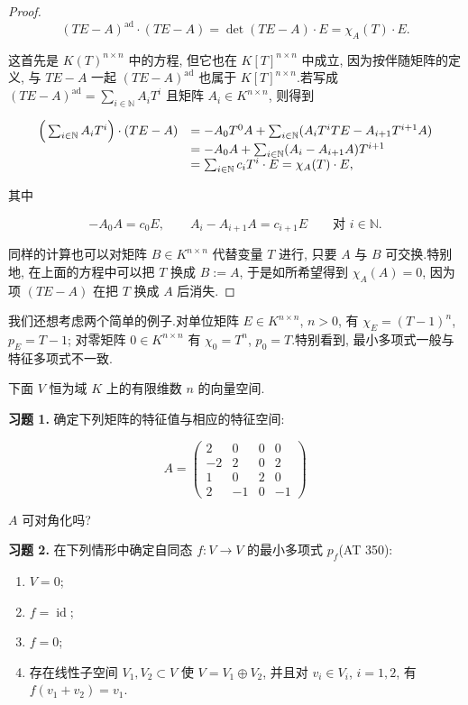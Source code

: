 \begin{proof}
\[
(TE - A)^{\mathrm{ad}} \cdot (TE - A) = \det(TE - A) \cdot E = \chi_A(T) \cdot E\text{.}\]

这首先是 $K(T)^{n \times n}$ 中的方程, 但它也在 $K[T]^{n \times n}$ 中成立, 因为按伴随矩阵的定义, 与 $TE - A$ 一起 $(TE - A)^{\mathrm{ad}}$ 也属于 $K[T]^{n \times n}$.若写成 $(TE - A)^{\mathrm{ad}} = \sum_{i \in \mathbb{N}} A_i T^i$ 且矩阵 $A_i \in K^{n \times n}$, 则得到

\[
\begin{array}{r l}
\Big(\sum_{i \in \mathbb{N}} A_i T^i\Big) \cdot (TE - A) & = -A_0 T^0 A + \sum_{i \in \mathbb{N}} (A_i T^i T E - A_{i + 1} T^{i + 1} A) \\
& = -A_0 A + \sum_{i \in \mathbb{N}} (A_i - A_{i + 1} A) T^{i + 1} \\
& = \sum_{i \in \mathbb{N}} c_i T^i \cdot E = \chi_A(T) \cdot E,
\end{array}\]

其中

\[
-A_0 A = c_0 E, \qquad A_i - A_{i + 1} A = c_{i + 1} E \qquad \text{对 } i \in \mathbb{N}\text{.}\]

同样的计算也可以对矩阵 $B \in K^{n \times n}$ 代替变量 $T$ 进行, 只要 $A$ 与 $B$ 可交换.特别地, 在上面的方程中可以把 $T$ 换成 $B := A$, 于是如所希望得到 $\chi_A(A) = 0$, 因为项 $(TE - A)$ 在把 $T$ 换成 $A$ 后消失.
\end{proof}

我们还想考虑两个简单的例子.对单位矩阵 $E \in K^{n \times n}$, $n > 0$, 有 $\chi_E = (T - 1)^n$, $p_E = T - 1$; 对零矩阵 $0 \in K^{n \times n}$ 有 $\chi_0 = T^n$, $p_0 = T$.特别看到, 最小多项式一般与特征多项式不一致.

\aufgaben

下面 $V$ 恒为域 $K$ 上的有限维数 $n$ 的向量空间.

\noindent\textbf{习题 1.} 确定下列矩阵的特征值与相应的特征空间:

\[
A = \left(\begin{array}{cccc} 2 & 0 & 0 & 0 \\ -2 & 2 & 0 & 2 \\ 1 & 0 & 2 & 0 \\ 2 & -1 & 0 & -1 \end{array}\right)\]

$A$ 可对角化吗?

\medskip
\noindent\textbf{习题 2.} 在下列情形中确定自同态 $f \colon V \longrightarrow V$ 的最小多项式 $p_f$(AT 350):
\begin{enumerate}
\item[(i)] $V = 0$;
\item[(ii)] $f = \operatorname{id}$;
\item[(iii)] $f = 0$;
\item[(iv)] 存在线性子空间 $V_1, V_2 \subset V$ 使 $V = V_1 \oplus V_2$, 并且对 $v_i \in V_i$, $i = 1, 2$, 有 $f(v_1 + v_2) = v_1$.
\end{enumerate}

